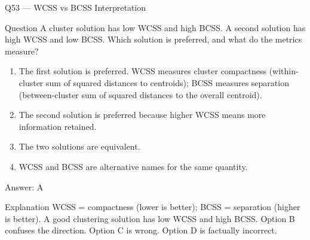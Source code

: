 \documentclass[aspectratio=169,8pt]{beamer}
\begin{document}
	\begin{frame}{Q53 --- WCSS vs BCSS Interpretation}
		\begin{block}{Question}
			A cluster solution has low WCSS and high BCSS. A second solution has high WCSS and low BCSS. Which solution is preferred, and what do the metrics measure?
		\end{block}
		\begin{enumerate}
			\item The first solution is preferred. WCSS measures cluster compactness (within-cluster sum of squared distances to centroids); BCSS measures separation (between-cluster sum of squared distances to the overall centroid).
			\item The second solution is preferred because higher WCSS means more information retained.
			\item The two solutions are equivalent.
			\item WCSS and BCSS are alternative names for the same quantity.
		\end{enumerate}
		\begin{exampleblock}{Answer: A}\end{exampleblock}
		\begin{block}{Explanation}
			WCSS = compactness (lower is better); BCSS = separation (higher is better). A good clustering solution has low WCSS and high BCSS. Option B confuses the direction. Option C is wrong. Option D is factually incorrect.
		\end{block}
	\end{frame}
	
\end{document}
